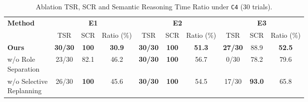 \begin{table}[t]
  \centering
  \caption{Ablation TSR, SCR and Semantic Reasoning Time Ratio under
  \texttt{C4} (30 trials).}
  \label{tab:ablation_comparison}
  \setlength{\tabcolsep}{1.25pt}
  \renewcommand{\arraystretch}{1.00}
  \scriptsize
  \begin{tabular*}{\columnwidth}{@{\extracolsep{\fill}}lccccccccc@{}}
    \toprule
    \multirow{2}{*}{\textbf{Method}} &
    \multicolumn{3}{c}{\textbf{E1}} &
    \multicolumn{3}{c}{\textbf{E2}} &
    \multicolumn{3}{c}{\textbf{E3}} \\
    \cmidrule(lr){2-4}\cmidrule(lr){5-7}\cmidrule(lr){8-10}
    & {\fontsize{6.3}{6.8}\selectfont TSR}
    & {\fontsize{6.3}{6.8}\selectfont SCR}
    & {\fontsize{6.3}{6.8}\selectfont Ratio (\%)}
    & {\fontsize{6.3}{6.8}\selectfont TSR}
    & {\fontsize{6.3}{6.8}\selectfont SCR}
    & {\fontsize{6.3}{6.8}\selectfont Ratio (\%)}
    & {\fontsize{6.3}{6.8}\selectfont TSR}
    & {\fontsize{6.3}{6.8}\selectfont SCR}
    & {\fontsize{6.3}{6.8}\selectfont Ratio (\%)} \\
    \midrule
    \textbf{Ours}
      & \textbf{30/30} & \textbf{100} & \textbf{30.9}
      & \textbf{30/30} & \textbf{100} & \textbf{51.3}
      & \textbf{27/30} & 88.9 & \textbf{52.5} \\
    \shortstack[l]{w/o Role\\Separation}
      & 23/30 & 82.1 & 46.2
      & \textbf{30/30} & \textbf{100} & 56.7
      & 0/30 & 78.2 & 79.6 \\
    \shortstack[l]{w/o Selective\\Replanning}
      & 26/30 & \textbf{100} & 45.6
      & \textbf{30/30} & \textbf{100} & 54.5
      & 17/30 & \textbf{93.0} & 65.8 \\
    \bottomrule
  \end{tabular*}
\end{table}
